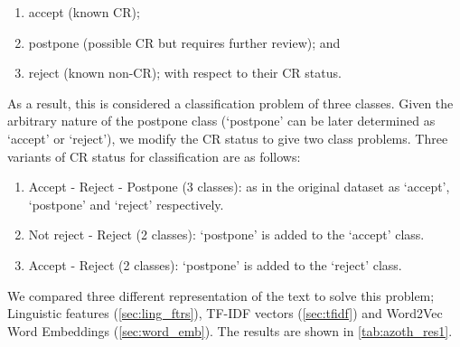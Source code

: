 \begin{enumerate}
    \item accept (known CR);
    \item postpone (possible CR but requires further review); and 
    \item reject (known non-CR); with respect to their CR status. 
\end{enumerate}

As a result, this is considered a classification problem of three classes. Given the arbitrary nature of the postpone class (`postpone' can be later determined as `accept' or `reject'), we modify the CR status to give two class problems. Three variants of CR status for classification are as follows:

\begin{enumerate}
    \item Accept - Reject - Postpone (3 classes): as in the original dataset as `accept', `postpone' and `reject' respectively.
    \item Not reject - Reject (2 classes): `postpone' is added to the `accept' class.
    \item Accept - Reject (2 classes): `postpone' is added to the `reject' class.
\end{enumerate}

We compared three different representation of the text to solve this problem; Linguistic features (\cref{sec:ling_ftrs}), TF-IDF vectors (\cref{sec:tfidf}) and Word2Vec Word Embeddings (\cref{sec:word_emb}). The results are shown in \cref{tab:azoth_res1}.


